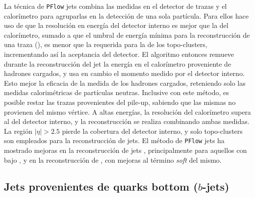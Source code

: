 La técnica de \texttt{PFlow} jets \cite{PERF-2015-09} combina las medidas en el detector de trazas y el calorímetro para agruparlas en la detección de una sola partícula. Para ellos hace uso de que la resolución en energía del detector interno es mejor que la del calorímetro, sumado a que el umbral de energía mínima para la reconstrucción de una traza (), es menor que la requerida para la de los topo-clusters, incrementando así la aceptancia del detector. El algoritmo entonces remueve durante la reconstrucción del jet la energía en el calorímetro proveniente de hadrones cargados, y usa en cambio el momento medido por el detector interno. Esto mejor la eficacia de la medida de los hadrones cargados, reteniendo solo las medidas calorimétricas de partículas neutras. Inclusive con este método, es posible restar las trazas provenientes del pile-up, sabiendo que las mismas no provienen del mismo vértice. A altas energías, la resolución del calorímetro supera al del detector interno, y la reconstrucción se realiza combinando ambas medidas. La región $|\eta|>2.5$ pierde la cobertura del detector interno, y solo topo-clusters son empleados para la reconstrucción de jets. El método de \texttt{PFlow} jets ha mostrado mejoras en la reconstrucción de jets \cite{PERF-2015-09}, principalmente para aquellos con bajo \pt, y en la reconstrucción de \met \cite{ATLAS-CONF-2018-023}, con mejoras al término \textit{soft} del mismo.


\subsection{Jets provenientes de quarks bottom ($b$-jets)}

